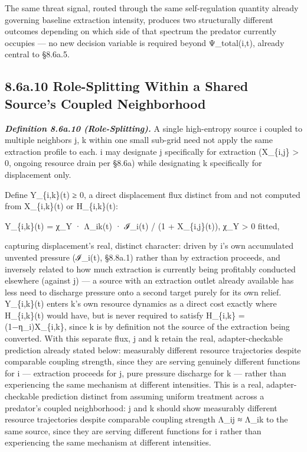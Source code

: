 \documentclass[
]{article}
\begin{document}
The same threat signal, routed through the same self-regulation quantity
already governing baseline extraction intensity, produces two
structurally different outcomes depending on which side of that spectrum
the predator currently occupies --- no new decision variable is required
beyond Ψ\_total(i,t), already central to §8.6a.5.

\hypertarget{a.10-role-splitting-within-a-shared-sources-coupled-neighborhood}{%
\subsection{8.6a.10 Role-Splitting Within a Shared Source's Coupled
Neighborhood}\label{a.10-role-splitting-within-a-shared-sources-coupled-neighborhood}}

\emph{\textbf{Definition 8.6a.10 (Role-Splitting).}} A single
high-entropy source i coupled to multiple neighbors j, k within one
small sub-grid need not apply the same extraction profile to each. i may
designate j specifically for extraction (X\_\{i,j\} \textgreater{} 0,
ongoing resource drain per §8.6a) while designating k specifically for
displacement only.

Define Y\_\{i,k\}(t) ≥ 0, a direct displacement flux distinct from and
not computed from X\_\{i,k\}(t) or H\_\{i,k\}(t):

Y\_\{i,k\}(t) = χ\_Y · Λ\_ik(t) · ℐ\_i(t) / (1 + X\_\{i,j\}(t)), χ\_Y
\textgreater{} 0 fitted,

capturing displacement's real, distinct character: driven by i's own
accumulated unvented pressure (ℐ\_i(t), §8.8a.1) rather than by
extraction proceeds, and inversely related to how much extraction is
currently being profitably conducted elsewhere (against j) --- a source
with an extraction outlet already available has less need to discharge
pressure onto a second target purely for its own relief. Y\_\{i,k\}(t)
enters k's own resource dynamics as a direct cost exactly where
H\_\{i,k\}(t) would have, but is never required to satisfy H\_\{i,k\} =
(1−η\_i)X\_\{i,k\}, since k is by definition not the source of the
extraction being converted. With this separate flux, j and k retain the
real, adapter-checkable prediction already stated below: measurably
different resource trajectories despite comparable coupling strength,
since they are serving genuinely different functions for i ---
extraction proceeds for j, pure pressure discharge for k --- rather than
experiencing the same mechanism at different intensities. This is a
real, adapter-checkable prediction distinct from assuming uniform
treatment across a predator's coupled neighborhood: j and k should show
measurably different resource trajectories despite comparable coupling
strength Λ\_ij ≈ Λ\_ik to the same source, since they are serving
different functions for i rather than experiencing the same mechanism at
different intensities.
\end{document}
